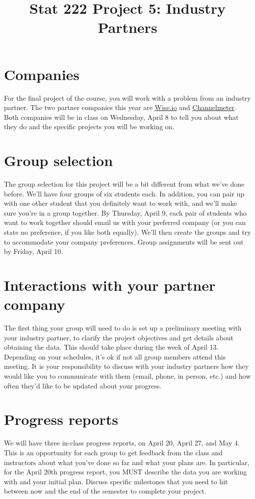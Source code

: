 \documentclass[11pt, oneside]{article}   	%
\title{Stat 222 Project 5: Industry Partners}
\date{}							%
\begin{document}
\maketitle

\section{Companies}

For the final project of the course, you will work with a problem from an industry partner. The two partner companies this year are \href{www.wise.io}{Wise.io} and \href{channelmeter.com}{Channelmeter}. Both companies will be in class on Wednesday, April 8 to tell you about what they do and the specific projects you will be working on.

\section{Group selection}

The group selection for this project will be a bit different from what we've done before. We'll have four groups of six students each. In addition, you can pair up with one other student that you definitely want to work with, and we'll make sure you're in a group together. By Thursday, April 9, each pair of students who want to work together should email us with your preferred company (or you can state no preference, if you like both equally). We'll then create the groups and try to accommodate your company preferences. Group assignments will be sent out by Friday, April 10.

\section{Interactions with your partner company}

The first thing your group will need to do is set up a preliminary meeting with your industry partner, to clarify the project objectives and get details about obtaining the data. This should take place during the week of April 13. Depending on your schedules, it's ok if not all group members attend this meeting. It is your responsibility to discuss with your industry partners how they would like you to communicate with them (email, phone, in person, etc.) and how often they'd like to be updated about your progress.

\section{Progress reports}
We will have three in-class progress reports, on April 20, April 27, and May 4. This is an opportunity for each group to get feedback from the class and instructors about what you've done so far and what your plans are. In particular, for the April 20th progress report, you MUST describe the data you are working with and your initial plan. Discuss specific milestones that you need to hit between now and the end of the semester to complete your project.
\end{document}
